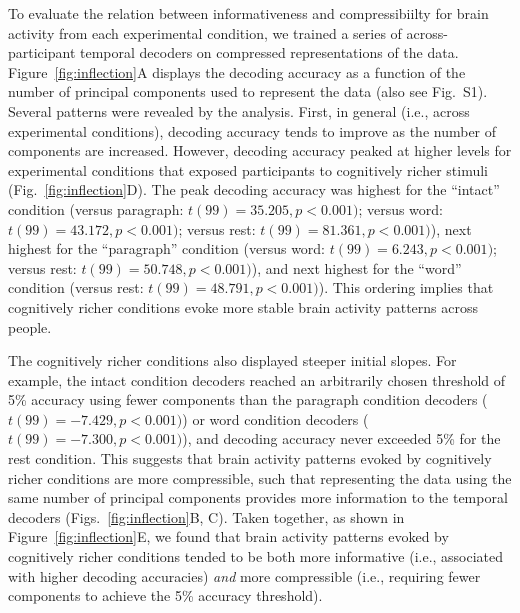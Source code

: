 \documentclass[english, 11pt]{article}
\newcommand{\varExplained}{S1}
\begin{document}
To evaluate the relation between informativeness and compressibiilty for brain
activity from each experimental condition, we trained a series of
across-participant temporal decoders on compressed representations of the data.
Figure~\ref{fig:inflection}A displays the decoding accuracy as a function of
the number of principal components used to represent the data (also see
Fig.~\varExplained). Several patterns were revealed by the analysis. First, in
general (i.e., across experimental conditions), decoding accuracy tends to
improve as the number of components are increased. However, decoding accuracy
peaked at higher levels for experimental conditions that exposed participants
to cognitively richer stimuli (Fig.~\ref{fig:inflection}D). The peak decoding
accuracy was highest for the ``intact'' condition (versus paragraph: $t(99) =
35.205, p < 0.001)$; versus word: $t(99) = 43.172, p < 0.001)$; versus rest:
$t(99) = 81.361, p < 0.001)$), next highest for the ``paragraph'' condition
(versus word: $t(99) = 6.243, p < 0.001)$; versus rest: $t(99) = 50.748, p <
0.001)$), and next highest for the ``word'' condition (versus rest: $t(99) =
48.791, p < 0.001)$). This ordering implies that cognitively richer conditions
evoke more stable brain activity patterns across people.

The cognitively richer conditions also displayed steeper initial slopes. For
example, the intact condition decoders reached an arbitrarily chosen threshold
of 5\% accuracy using fewer components than the paragraph condition decoders
($t(99) = -7.429, p < 0.001)$) or word condition decoders ($t(99) = -7.300, p <
0.001)$), and decoding accuracy never exceeded 5\% for the rest condition. This
suggests that brain activity patterns evoked by cognitively richer conditions
are more compressible, such that representing the data using the same number of
principal components provides more information to the temporal decoders
(Figs.~\ref{fig:inflection}B, C). Taken together, as shown in
Figure~\ref{fig:inflection}E, we found that brain activity patterns evoked by
cognitively richer conditions tended to be both more informative (i.e.,
associated with higher decoding accuracies) \textit{and} more compressible
(i.e., requiring fewer components to achieve the 5\% accuracy threshold).
\end{document}
